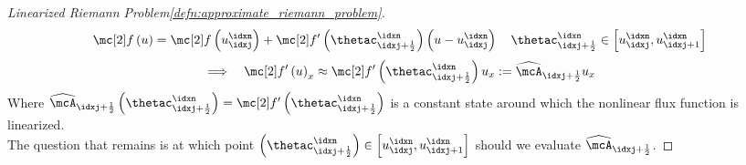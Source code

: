 \begin{proofbox}\nospacing
    \begin{proof}[Linearized Riemann Problem\cref{defn:approximate_riemann_problem}]\label{proof:defn:approximate_riemann_problem}\leavevmode\\
    \begin{align*}
      \flux \left(u\right)=\flux \left(u_{\idxj}^{\idxn}\right)+\flux' \left(\thetac^{\idxn}_{\idxj+\frac{1}{2}}\right)\left(u-u_{\idxj}^{\idxn}\right)
      \quad\thetac^{\idxn}_{\idxj+\frac{1}{2}}\in \left[u_{\idxj}^{\idxn},u_{\idxj+1}^{\idxn}\right]
    \end{align*}
    \begin{align}
      \implies&&\flux' \left(u\right)_{x}\approx\flux' \left(\thetac^{\idxn}_{\idxj+\frac{1}{2}}\right)u_{x}:=\widehat{\mcA}_{\idxj+\frac{1}{2}}u_{x}
    \end{align}
    Where $\widehat{\mcA}_{\idxj+\frac{1}{2}}\left(\thetac^{\idxn}_{\idxj+\frac{1}{2}}\right)=\flux'\left(\thetac^{\idxn}_{\idxj+\frac{1}{2}}\right)$ is a constant state around which the nonlinear flux function is linearized.\\
    The question that remains is at which point $\left(\thetac^{\idxn}_{\idxj+\frac{1}{2}}\right)\in \left[u_{\idxj}^{\idxn},u_{\idxj+1}^{\idxn}\right]$ should we evaluate
    $\widehat{\mcA}_{\idxj+\frac{1}{2}}$.
    \end{proof}
\end{proofbox}
